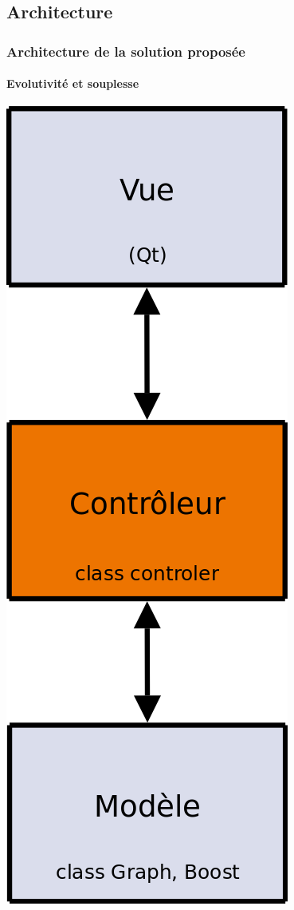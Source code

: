 \subsection{Architecture}
\frame
{
\frametitle{Architecture de la solution propos\'ee}
\framesubtitle{Evolutivité et souplesse}

\begin{minipage}{0.45\textwidth}
\begin{flushleft}
\begin{center}
\includegraphics[height=0.90\textheight]{mvcScheme.png}

\end{center}
\end{flushleft}
\end{minipage}}
